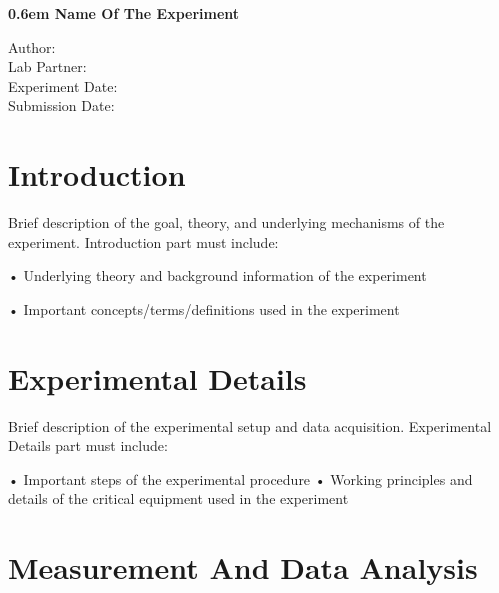 \documentclass[12pt]{extarticle}
\begin{document}
	
	\clearpage
	\newcommand\nbvspace[1][3]{\vspace*{\stretch{#1}}}
	\newcommand\nbstretchyspace{\spaceskip0.5em plus 0.25em minus 0.25em}
	\newcommand{\nbtitlestretch}{\spaceskip0.6em}
	\begin{center}
		\bfseries
		\nbvspace[1]
		\Huge
		{\nbtitlestretch\huge
			Name Of The Experiment}
		
		\nbvspace[1]
		\normalsize
		
		\footnotesize  
		Author: 
		\\
		Lab Partner:
		\\
		Experiment Date:
		\\
		Submission Date:
		
		
		
		
		\nbvspace[2]
		
		\nbvspace[3]
		\normalsize
		
		
		\nbvspace[1]
	\end{center}
	
	\newpage
	\tableofcontents
	\newpage
			
	\section{Introduction}
	
	Brief description of the goal, theory, and underlying mechanisms of the experiment. Introduction part must include:
	
	 •	Underlying theory and background information of the experiment
	 
	 •	Important concepts/terms/definitions used in the experiment
	 
	
	\section{Experimental Details}
	
	Brief description of the experimental setup and data acquisition. Experimental Details part must include:
	
	•	Important steps of the experimental procedure
	•	Working principles and details of the critical equipment used in the experiment
	
	
	\section{Measurement And Data Analysis}
	
\end{document}
